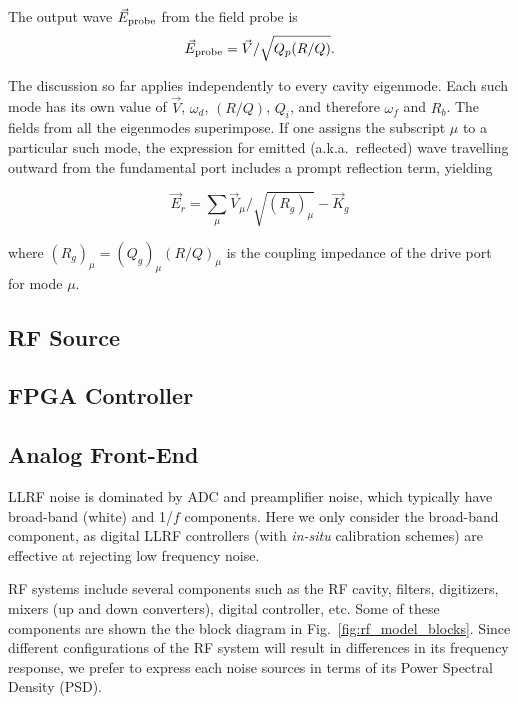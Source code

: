 \documentclass[a4paper,12pt]{article}
\begin{document}
The output wave $\vec E_{\rm probe}$ from the field probe is 
\begin{equation}
  \vec E_{\rm probe}=\vec V / \sqrt{Q_p(R/Q)}.
\end{equation}

The discussion so far applies independently to every cavity eigenmode. Each such mode has its own value of $\vec V$, $\omega_d$, $(R/Q)$, $Q_i$, and therefore $\omega_f$ and $R_b$.  The fields from all the eigenmodes
superimpose.  If one assigns the subscript $\mu$ to a particular such mode, the expression for emitted (a.k.a.~reflected) wave travelling outward from the fundamental port includes a prompt reflection term, yielding

\begin{equation}
  \vec E_r=\sum_\mu \vec V_\mu / \sqrt{(R_g)_{\mu}} - \vec K_g
\end{equation}

where $(R_g)_{\mu} = (Q_g)_{\mu}(R/Q)_\mu$ is the coupling impedance of the drive port for mode $\mu$.

\subsection{RF Source}

\subsection{FPGA Controller}

\subsection{Analog Front-End}

LLRF noise is dominated by ADC and preamplifier noise, which typically have broad-band (white) and 1/$f$ components. Here we only consider the broad-band component, as digital LLRF controllers (with {\it in-situ} calibration schemes) are effective at rejecting low frequency noise.

RF systems include several components such as the RF cavity, filters, digitizers, mixers (up and down converters), digital controller, etc. Some of these components are shown the the block diagram in Fig.~\ref{fig:rf_model_blocks}. Since different configurations of the RF system will result in differences in its frequency response, we prefer to express each noise sources in terms of its Power Spectral Density (PSD).
\end{document}
